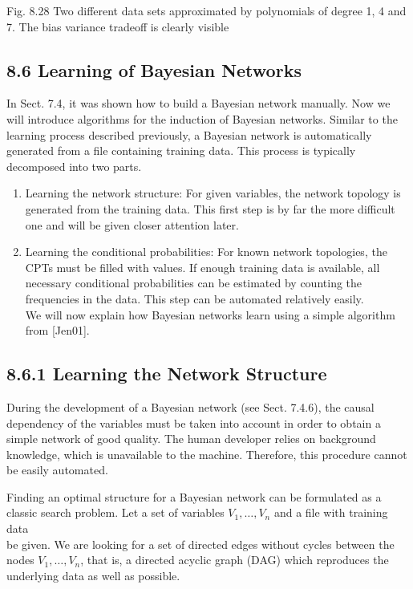 \documentclass[10pt]{article}
\begin{document}
Fig. 8.28 Two different data sets approximated by polynomials of degree 1, 4 and 7. The bias variance tradeoff is clearly visible


\subsection*{8.6 Learning of Bayesian Networks}
In Sect. 7.4, it was shown how to build a Bayesian network manually. Now we will introduce algorithms for the induction of Bayesian networks. Similar to the learning process described previously, a Bayesian network is automatically generated from a file containing training data. This process is typically decomposed into two parts.


\begin{enumerate}
  \item Learning the network structure: For given variables, the network topology is generated from the training data. This first step is by far the more difficult one and will be given closer attention later.
  \item Learning the conditional probabilities: For known network topologies, the CPTs must be filled with values. If enough training data is available, all necessary conditional probabilities can be estimated by counting the frequencies in the data. This step can be automated relatively easily.\\[0pt]
We will now explain how Bayesian networks learn using a simple algorithm from [Jen01].
\end{enumerate}

\subsection*{8.6.1 Learning the Network Structure}
During the development of a Bayesian network (see Sect. 7.4.6), the causal dependency of the variables must be taken into account in order to obtain a simple network of good quality. The human developer relies on background knowledge, which is unavailable to the machine. Therefore, this procedure cannot be easily automated.

Finding an optimal structure for a Bayesian network can be formulated as a classic search problem. Let a set of variables $V_{1}, \ldots, V_{n}$ and a file with training data\\
be given. We are looking for a set of directed edges without cycles between the nodes $V_{1}, \ldots, V_{n}$, that is, a directed acyclic graph (DAG) which reproduces the underlying data as well as possible.
\end{document}
